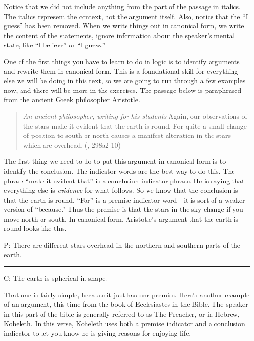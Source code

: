Notice that we did not include anything from the part of the passage in italics. The italics represent the context, not the argument itself. Also, notice that the ``I guess'' has been removed. When we write things out in canonical form, we write the content of the statements, ignore information about the speaker's mental state, like ``I believe'' or ``I guess.'' 

One of the first things you have to learn to do in logic is to identify arguments and rewrite them in canonical form. This is a foundational skill for everything else we will be doing in this text, so we are going to run through a few examples now, and there will be more in the exercises. The passage below is paraphrased from the ancient Greek philosopher Aristotle. 

\begin{quotation}\noindent \textit{An ancient philosopher, writing for his students} Again, our observations of the stars make it evident that the earth is round. For quite a small change of position to south or north causes a manifest alteration in the stars which are overhead. (\cite{Aristotle:heavens}, 298a2-10)
\label{on_the_heavens} \end{quotation}

The first thing we need to do to put this argument in canonical form is to identify the conclusion. The indicator words are the best way to do this. The phrase ``make it evident that'' is a conclusion indicator phrase. He is saying that everything else is \textit{evidence} for what follows. So we know that the conclusion is that the earth is round. ``For'' is a premise indicator word---it is sort of a weaker version of ``because.''  Thus the premise is that the stars in the sky change if you move north or south. In canonical form, Aristotle's argument that the earth is round looks like this.\\


\begin{earg}
\item[P:] There are different stars overhead in the northern and southern parts of the earth.
\vspace{-.5em}
\item [] \rule{0.9\linewidth}{.5pt} 
\item[C:] The earth is spherical in shape. 
\end{earg} 

That one is fairly simple, because it just has one premise. Here's another example of an argument, this time from the book of Ecclesiastes in the Bible. The speaker in this part of the bible is generally referred to as The Preacher, or in Hebrew, Koheleth. In this verse, Koheleth uses both a premise indicator and a conclusion indicator to let you know he is giving reasons for enjoying life.

